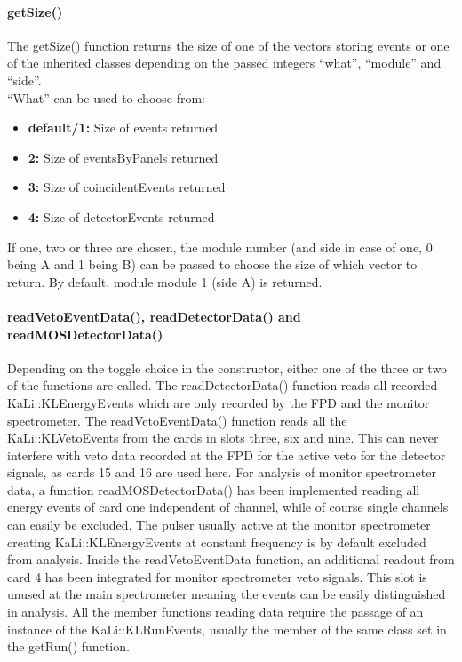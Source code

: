     \paragraph{getSize()}
    \label{ch:Analysis software:sec:methods of the class run:subsec:getSize()}
    The getSize() function returns the size of one of the vectors storing events or one of the inherited classes depending on the passed integers ``what'', ``module'' and ``side''.\\
    ``What'' can be used to choose from:
    	\begin{itemize}
		
    		\item {\bf default/1:} Size of events returned
    		\item {\bf 2:} Size of eventsByPanels returned
    		\item {\bf 3:} Size of coincidentEvents returned
    		\item {\bf 4:} Size of detectorEvents returned
    	\end{itemize}
	If one, two or three are chosen, the module number (and side in case of one, 0 being A and 1 being B) can be passed to choose the size of which vector to return. By default, module module 1 (side A) is returned.
    
    
    \paragraph{readVetoEventData(), readDetectorData() and readMOSDetectorData()}
    \label{ch:Analysis software:sec:methods of the class run:subsec:readVetoEventData(), readDetectorData() and readMOSDetectorData()}
    Depending on the toggle choice in the constructor, either one of the three or two of the functions are called. The readDetectorData() function reads all recorded KaLi::\-KLEnergy\-Events which are only recorded by the FPD and the monitor spectrometer. The readVetoEventData() function reads all the KaLi::KLVetoEvents from the cards in slots three, six and nine. This can never interfere with veto data recorded at the FPD for the active veto for the detector signals, as cards 15 and 16 are used here.
    For analysis of monitor spectrometer data, a function readMOSDetectorData() has been implemented reading all energy events of card one independent of channel, while of course single channels can easily be excluded. The pulser usually active at the monitor spectrometer creating KaLi::KLEnergyEvents at constant frequency is by default excluded from analysis.
    Inside the readVetoEventData function, an additional readout from card 4 has been integrated for monitor spectrometer veto signals. This slot is unused at the main spectrometer meaning the events can be easily distinguished in analysis.
    All the member functions reading data require the passage of an instance of the KaLi::KLRunEvents, usually the member of the same class set in the getRun() function.
    
    
    
    
    
      